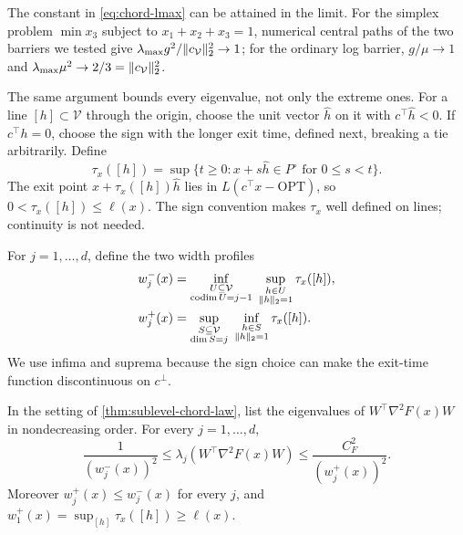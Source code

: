 The constant in \eqref{eq:chord-lmax} can be attained in the limit.  For
the simplex problem $\min x_3$ subject to $x_1+x_2+x_3=1$, numerical
central paths of the two barriers we tested give
$\lambda_{\max}g^2/\lVert c_{\mathcal V}\rVert_2^2\to1$; for the ordinary log
barrier, $g/\mu\to1$ and
$\lambda_{\max}\mu^2\to2/3=\lVert c_{\mathcal V}\rVert_2^2$.

The same argument bounds every eigenvalue, not only the extreme ones.  For a
line $[h]\subset\mathcal V$ through the origin, choose the unit vector
$\widehat h$ on it with $c^\top\widehat h<0$.  If $c^\top h=0$, choose the
sign with the longer exit time, defined next, breaking a tie arbitrarily.
Define
\begin{equation}
 \tau_x([h])=\sup\{t\geq0:x+s\widehat h\in P^\circ
                     \text{ for }0\leq s<t\}.
 \label{eq:directional-exit-time}
\end{equation}
The exit point $x+\tau_x([h])\widehat h$ lies in $L(c^\top x-\mathrm{OPT})$,
so $0<\tau_x([h])\leq\ell(x)$.  The sign convention makes $\tau_x$ well
defined on lines; continuity is not needed.

For $j=1,\ldots,d$, define the two width profiles
\begin{align}
 w_j^-(x)
 &=\inf_{\substack{U\subseteq\mathcal V\\\operatorname{codim}U=j-1}}
   \ \sup_{\substack{h\in U\\\lVert h\rVert_2=1}}\tau_x([h]),
 \label{eq:lower-width-profile}\\
 w_j^+(x)
 &=\sup_{\substack{S\subseteq\mathcal V\\\dim S=j}}
   \ \inf_{\substack{h\in S\\\lVert h\rVert_2=1}}\tau_x([h]).
 \label{eq:upper-width-profile}
\end{align}
We use infima and suprema because the sign choice can make the exit-time
function discontinuous on $c^\perp$.

\begin{theorem}
\label{thm:width-spectrum-rigidity}
In the setting of \cref{thm:sublevel-chord-law}, list the eigenvalues of
$W^\top\nabla^2F(x)W$ in nondecreasing order.  For every
$j=1,\ldots,d$,
\begin{equation}
 \frac1{(w_j^-(x))^2}
 \leq\lambda_j\!\left(W^\top\nabla^2F(x)W\right)
 \leq\frac{C_F^2}{(w_j^+(x))^2}.
 \label{eq:width-spectrum-sandwich}
\end{equation}
Moreover $w_j^+(x)\leq w_j^-(x)$ for every $j$, and
$w_1^+(x)=\sup_{[h]}\tau_x([h])\geq\ell(x)$.
\end{theorem}

